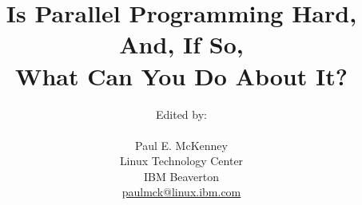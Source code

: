 \documentclass[10pt,twocolumn]{pfbook} %
\begin{document}
\newcommand{\co}[1]{\lstinline[breaklines=true,breakatwhitespace=true]{#1}}
\newcommand{\nbco}[1]{\mbox{\PVerb[pverb-space=invnobreak]{#1}}} %
\newcommand{\qco}[1]{``\nbco{#1}''} %
\newcommand{\tco}[1]{\texttt{\detokenize{#1}}} %
\newcommand{\lopt}[1]{\tco{-}\tco{-}\tco{#1}} %
\newcommand{\nf}[1]{\textnormal{#1}} %
\newcommand{\qop}[1]{{\sffamily #1}} %

\DeclareRobustCommand{\euler}{\ensuremath{\mathrm{e}}}
\DeclareRobustCommand{\O}[1]{\ensuremath{\mathcal{O}(#1)}}
\newcommand{\Power}[1]{POWER#1}
\newcommand{\GNUC}{GNU~C}
\newcommand{\GCC}{GCC}
\newcommand{\IRQ}{IRQ}
\newcommand{\rt}{\mbox{-rt}} %
\newcommand{\mytexttrademark}{}
\newcommand{\mytextregistered}{}

\newcommand{\Epigraph}[2]{\epigraphhead[65]{\epigraph{#1}{#2}}}


\title{
  Is Parallel Programming Hard, And, If So, \\
  What Can You Do About It?}
\author{
	Edited by: \\
	\\
	Paul E. McKenney \\
	Linux Technology Center \\
	IBM Beaverton \\
	\href{mailto:paulmck@linux.ibm.com}{paulmck@linux.ibm.com} \\
} %


\setcounter{topnumber}{3}
\renewcommand\topfraction{.75}
\setcounter{bottomnumber}{2}
\renewcommand\bottomfraction{.3}
\setcounter{totalnumber}{5}
\renewcommand\textfraction{.15}
\renewcommand\floatpagefraction{.5}
\setcounter{dbltopnumber}{3}
\renewcommand\dbltopfraction{.75}
\renewcommand\dblfloatpagefraction{.5}
\end{document}

